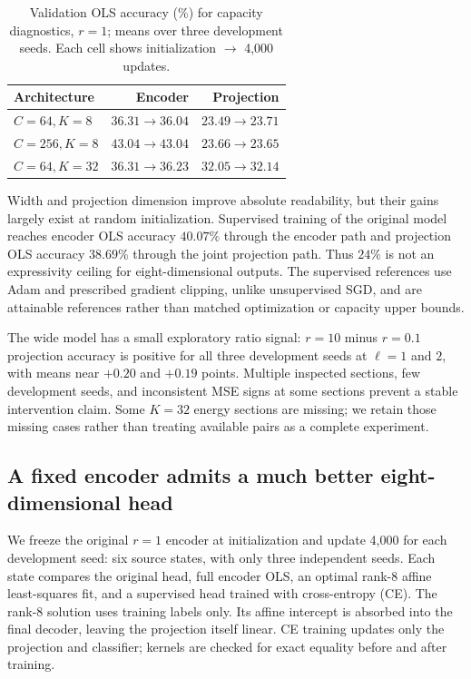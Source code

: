 \begin{table}[t]
\centering\small
\caption{Validation OLS accuracy (\%) for capacity diagnostics, $r=1$; means over three development seeds. Each cell shows initialization $\to$ 4,000 updates.}
\label{tab:capacity}
\setlength{\tabcolsep}{4pt}
\begin{tabular}{lrr}
\toprule
Architecture&Encoder&Projection\\\midrule
$C=64,K=8$&$36.31\to36.04$&$23.49\to23.71$\\
$C=256,K=8$&$43.04\to43.04$&$23.66\to23.65$\\
$C=64,K=32$&$36.31\to36.23$&$32.05\to32.14$\\
\bottomrule
\end{tabular}
\end{table}

Width and projection dimension improve absolute readability, but their gains largely exist at random initialization. Supervised training of the original model reaches encoder OLS accuracy $40.07\%$ through the encoder path and projection OLS accuracy $38.69\%$ through the joint projection path. Thus $24\%$ is not an expressivity ceiling for eight-dimensional outputs. The supervised references use Adam and prescribed gradient clipping, unlike unsupervised SGD, and are attainable references rather than matched optimization or capacity upper bounds.

The wide model has a small exploratory ratio signal: $r=10$ minus $r=0.1$ projection accuracy is positive for all three development seeds at $\ell=1$ and $2$, with means near $+0.20$ and $+0.19$ points. Multiple inspected sections, few development seeds, and inconsistent MSE signs at some sections prevent a stable intervention claim. Some $K=32$ energy sections are missing; we retain those missing cases rather than treating available pairs as a complete experiment.

\subsection{A fixed encoder admits a much better eight-dimensional head}
We freeze the original $r=1$ encoder at initialization and update 4,000 for each development seed: six source states, with only three independent seeds. Each state compares the original head, full encoder OLS, an optimal rank-8 affine least-squares fit, and a supervised head trained with cross-entropy (CE). The rank-8 solution uses training labels only. Its affine intercept is absorbed into the final decoder, leaving the projection itself linear. CE training updates only the projection and classifier; kernels are checked for exact equality before and after training.

